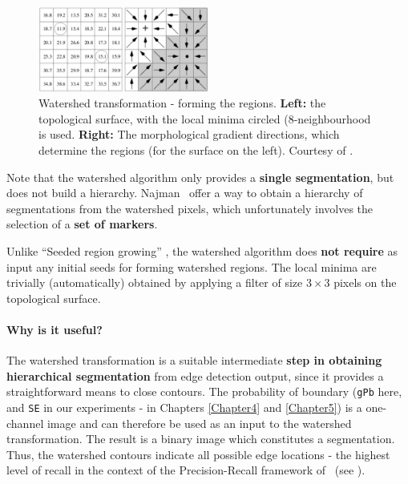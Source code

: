 \begin{figure}[ht!]
 \centering
 \includegraphics[width=0.5\textwidth]{images/gPb-OWT-UCM/watershed-transformation-forming-regions.png}
 \caption[Watershed transformation - forming the regions]{Watershed transformation - forming the regions. {\bf Left:} the topological surface, with the local minima circled (8-neighbourhood is used. %
 {\bf Right:} The morphological gradient directions, which determine the regions (for the surface on the left). Courtesy of \cite{MarcoBlog2007Watershed}.}
 \label{fig:watershed-transformation-forming-regions}
\end{figure}

Note that the watershed algorithm only provides a {\bf single segmentation}, but does not build a hierarchy. %
Najman~\etal \cite{Najman1996geodesic} offer a way to obtain a hierarchy of segmentations from the watershed pixels, which unfortunately involves the selection of a {\bf set of markers}.

Unlike ``Seeded region growing'' \cite{Adams1994seeded}, the watershed algorithm does {\bf not require} as input any initial seeds for forming watershed regions. The local minima are trivially (automatically) obtained by applying a filter of size $3\times 3$ pixels on the topological surface.

\paragraph{Why is it useful?} The watershed transformation is a suitable intermediate {\bf step in obtaining hierarchical segmentation} from edge detection output, since it provides a straightforward means to close contours. The probability of boundary ({\tt gPb} here, and {\tt SE} in our experiments - in Chapters \ref{Chapter4} and \ref{Chapter5}) is a one-channel image and can therefore be used as an input to the watershed transformation. The result is a binary image which constitutes a segmentation. Thus, the watershed contours indicate all possible edge locations - the highest level of recall in the context of the Precision-Recall framework of~\cite{Arbelaez11} (see ). %

